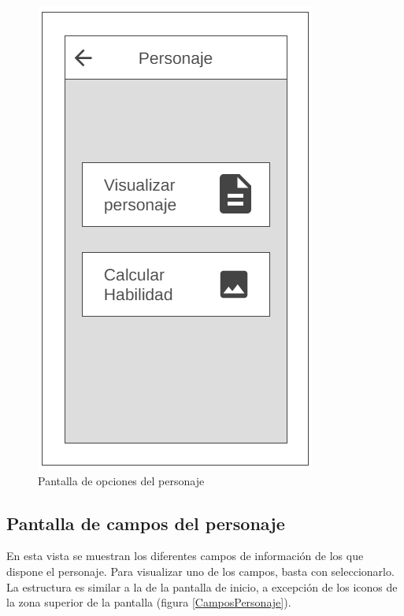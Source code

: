 \begin{figure}[H]
    \centering
    \includegraphics[scale=0.3]{Figures/Mockups/Mock_OpcionesPersonaje.png}
    \caption{Pantalla de opciones del personaje}
    \label{OpcionesPersonaje}    
\end{figure}

\subsection{Pantalla de campos del personaje}
En esta vista se muestran los diferentes campos de información de los que dispone el personaje.
Para visualizar uno de los campos, basta con seleccionarlo. La estructura es similar a la de la 
pantalla de inicio, a excepción de los iconos de la zona superior de la pantalla (figura \ref*{CamposPersonaje}).

